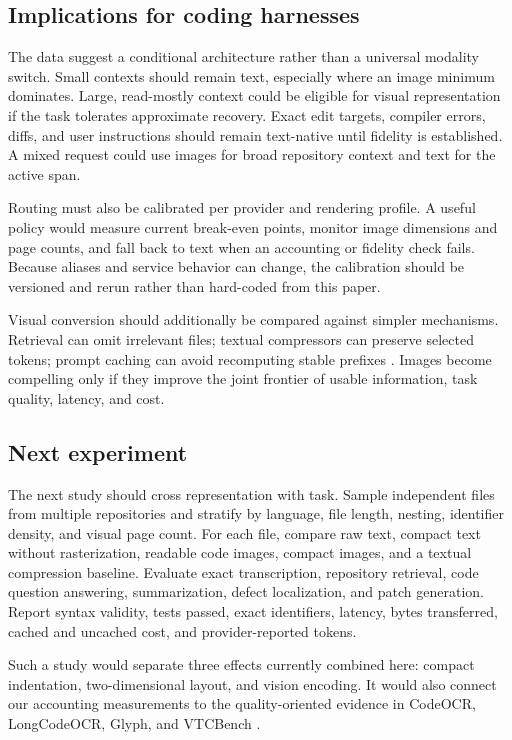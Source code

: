 \documentclass[sigconf,nonacm]{acmart}
\begin{document}
\subsection{Implications for coding harnesses}

The data suggest a conditional architecture rather than a universal modality
switch. Small contexts should remain text, especially where an image minimum
dominates. Large, read-mostly context could be eligible for visual
representation if the task tolerates approximate recovery. Exact edit targets,
compiler errors, diffs, and user instructions should remain text-native until
fidelity is established. A mixed request could use images for broad repository
context and text for the active span.

Routing must also be calibrated per provider and rendering profile. A useful
policy would measure current break-even points, monitor image dimensions and
page counts, and fall back to text when an accounting or fidelity check fails.
Because aliases and service behavior can change, the calibration should be
versioned and rerun rather than hard-coded from this paper.

Visual conversion should additionally be compared against simpler mechanisms.
Retrieval can omit irrelevant files; textual compressors can preserve selected
tokens; prompt caching can avoid recomputing stable prefixes
\cite{jiang_2023_llmlingua,jiang_2024_longllmlingua,gim_2023_promptcache}.
Images become compelling only if they improve the joint frontier of usable
information, task quality, latency, and cost.

\subsection{Next experiment}

The next study should cross representation with task. Sample independent files
from multiple repositories and stratify by language, file length, nesting,
identifier density, and visual page count. For each file, compare raw text,
compact text without rasterization, readable code images, compact images, and a
textual compression baseline. Evaluate exact transcription, repository
retrieval, code question answering, summarization, defect localization, and
patch generation. Report syntax validity, tests passed, exact identifiers,
latency, bytes transferred, cached and uncached cost, and provider-reported
tokens.

Such a study would separate three effects currently combined here: compact
indentation, two-dimensional layout, and vision encoding. It would also connect
our accounting measurements to the quality-oriented evidence in CodeOCR,
LongCodeOCR, Glyph, and VTCBench
\cite{zhang_2026_codeocr,longcodeocr_2026,cheng_2026_glyph,vtcbench_2025}.
\end{document}
